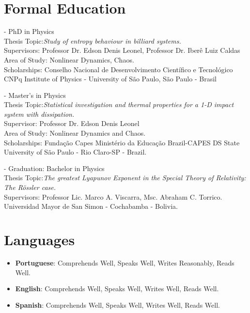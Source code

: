\documentclass[margin,line]{resume}
\begin{document}
\begin{resume}
    \section{\mysidestyle Formal Education}

 -  PhD in Physics \\
           Thesis Topic:{\it Study of entropy behaviour in billiard systems.}\\
           Supervisors: { Professor Dr. Edson Denis Leonel, Professor Dr. Iber\^e Luiz Caldas}\\
           Area of Study: Nonlinear Dynamics, Chaos.\\
           Scholarships: Conselho Nacional de Desenvolvimento Cient\'ifico e Tecnol\'ogico CNPq
           Institute of Physics - University of S\~ao Paulo, S\~ao Paulo - Brasil


 - Master's in Physics \\
           Thesis Topic:{\it Statistical investigation and thermal properties for a 1-D impact system with dissipation.}\\
           Supervisor: { Professor Dr. Edson Denis Leonel}\\
           Area of Study: Nonlinear Dynamics and Chaos.\\
           Scholarships: Funda\c c\~ao Capes Minist\'erio da Educa\c c\~ao Brazil-CAPES DS
           State University of S\~ao Paulo - Rio Claro-SP - Brazil.

 - Graduation: Bachelor in Physics\\
         Thesis Topic:{\it The greatest Lyapunov Exponent in the Special Theory of Relativity: The R\"ossler case.}\\   
         Supervisors: Professor Lic. Marco A. Viscarra, Msc. Abraham C. Torrico.\\
         Universidad Mayor de San Simon - Cochabamba - Bolivia.
    
\section{\mysidestyle Languages}
\begin{itemize}
     \item {{\bf Portuguese}: Comprehends Well, Speaks Well, Writes Reasonably, Reads Well.}
     \item {\bf English}: Comprehends Well, Speaks Well, Writes Well, Reads Well.
     \item {\bf Spanish}: Comprehends Well, Speaks Well, Writes Well, Reads Well.
\end{itemize}


\end{resume}
\end{document}

